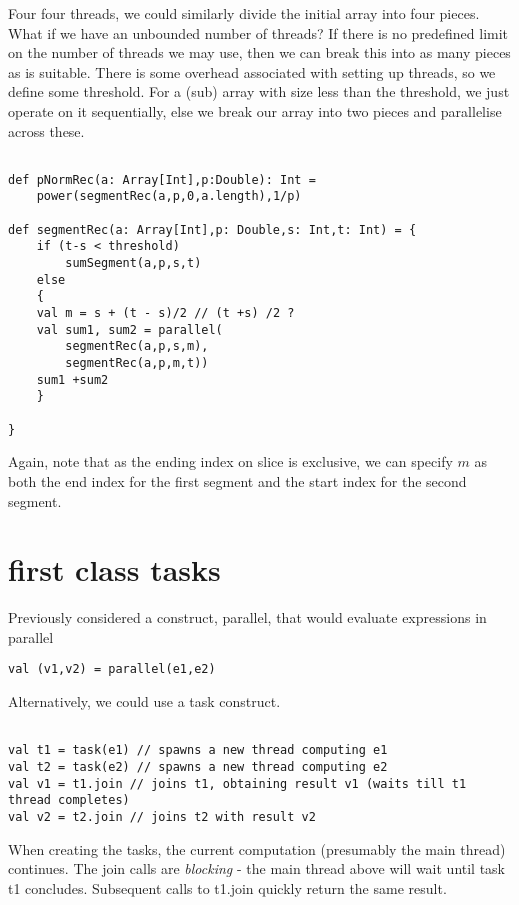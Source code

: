 Four four threads, we could similarly divide the initial array into four pieces. What if we have an unbounded number of threads? If there is no predefined limit on the number of threads we may use, then we can break this into as many pieces as is suitable. There is some overhead associated with setting up threads, so we define some threshold. For a (sub) array with size less than the threshold, we just operate on it sequentially, else we break our array into two pieces and parallelise across these.

\begin{lstlisting}

def pNormRec(a: Array[Int],p:Double): Int = 
    power(segmentRec(a,p,0,a.length),1/p)

def segmentRec(a: Array[Int],p: Double,s: Int,t: Int) = {
    if (t-s < threshold)
        sumSegment(a,p,s,t)
    else
    {
    val m = s + (t - s)/2 // (t +s) /2 ?
    val sum1, sum2 = parallel(
        segmentRec(a,p,s,m),
        segmentRec(a,p,m,t))
    sum1 +sum2
    }

}
\end{lstlisting}
Again, note that as the ending index on slice is exclusive, we can specify $m$ as both the end index for the first segment and the start index for the second segment.

\section{first class tasks}
Previously considered a construct, parallel, that would evaluate expressions in parallel
\begin{lstlisting}
val (v1,v2) = parallel(e1,e2)
\end{lstlisting}

Alternatively, we could use a task construct.
\begin{lstlisting}

val t1 = task(e1) // spawns a new thread computing e1
val t2 = task(e2) // spawns a new thread computing e2
val v1 = t1.join // joins t1, obtaining result v1 (waits till t1 thread completes)
val v2 = t2.join // joins t2 with result v2

\end{lstlisting}

When creating the tasks, the current computation (presumably the main thread) continues. The join calls are { \em blocking} - the main thread above will wait until task t1 concludes. Subsequent calls to t1.join quickly return the same result.


